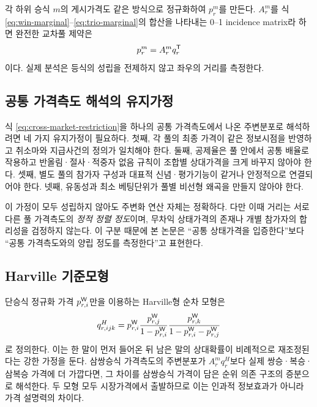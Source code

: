 각 하위 승식 $m$의 게시가격도 같은 방식으로 정규화하여 $p^m_r$를 만든다.
$A^m_r$를 식 \eqref{eq:win-marginal}--\eqref{eq:trio-marginal}의 합산을 나타내는
0--1 incidence matrix라 하면 완전한 교차풀 제약은
\begin{equation}
  p^m_r=A^m_r q^{\mathsf{T}}_r
  \label{eq:cross-market-restriction}
\end{equation}
이다. 실제 분석은 등식의 성립을 전제하지 않고 좌우의 거리를 측정한다.

\subsection{공통 가격측도 해석의 유지가정}

식 \eqref{eq:cross-market-restriction}을 하나의 공통 가격측도에서 나온 주변분포로
해석하려면 네 가지 유지가정이 필요하다. 첫째, 각 풀의 최종 가격이 같은
정보시점을 반영하고 취소마와 지급사건의 정의가 일치해야 한다. 둘째, 공제율은
풀 안에서 공통 배율로 작용하고 반올림·절사·적중자 없음 규칙이 조합별
상대가격을 크게 바꾸지 않아야 한다. 셋째, 별도 풀의 참가자 구성과 대표적
신념·평가기능이 같거나 안정적으로 연결되어야 한다. 넷째, 유동성과 최소
베팅단위가 풀별 비선형 왜곡을 만들지 않아야 한다.

이 가정이 모두 성립하지 않아도 주변화 연산 자체는 정확하다. 다만 이때 거리는
서로 다른 풀 가격측도의 \emph{정적 정렬 정도}이며, 무차익 상태가격의 존재나
개별 참가자의 합리성을 검정하지 않는다. 이 구분 때문에 본 논문은
``공통 상태가격을 입증한다''보다 ``공통 가격측도와의 양립 정도를 측정한다''고
표현한다.

\subsection{Harville 기준모형}

단승식 정규화 가격 $p^{\mathsf{W}}_{r,i}$만을 이용하는 Harville형 순차
모형\citep{harville1973}은
\begin{equation}
  q^{H}_{r,ijk}
  =p^{\mathsf{W}}_{r,i}
   \frac{p^{\mathsf{W}}_{r,j}}{1-p^{\mathsf{W}}_{r,i}}
   \frac{p^{\mathsf{W}}_{r,k}}{1-p^{\mathsf{W}}_{r,i}-p^{\mathsf{W}}_{r,j}}
  \label{eq:harville}
\end{equation}
로 정의한다. 이는 한 말이 먼저 들어온 뒤 남은 말의 상대확률이 비례적으로
재조정된다는 강한 가정을 둔다. 삼쌍승식 가격측도의 주변분포가
$A^m_rq^H_r$보다 실제 쌍승·복승·삼복승 가격에 더 가깝다면, 그 차이를
삼쌍승식 가격이 담은 순위 의존 구조의 증분으로 해석한다. 두 모형 모두
시장가격에서 출발하므로 이는 인과적 정보효과가 아니라 가격 설명력의 차이다.
